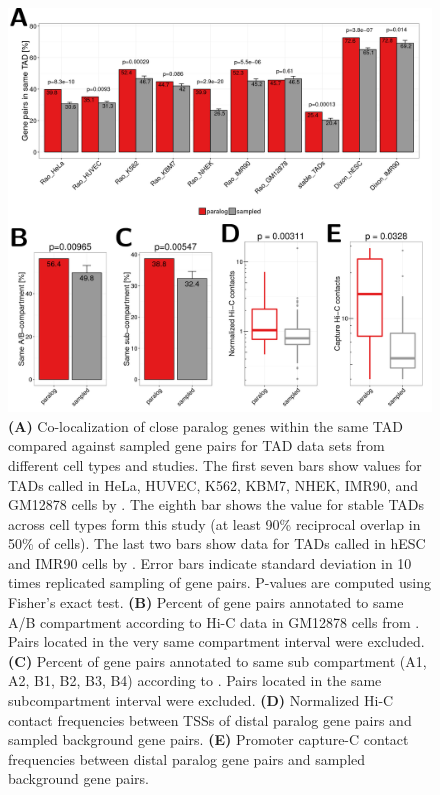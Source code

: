 \documentclass[a4paper,twoside=true,openright,parskip=full,chapterprefix=true,11pt,headings=normal,bibliography=totoc,listof=totoc,titlepage=on,captions=tableabove,draft=false]{scrreprt}
\theoremstyle{definition}
\theoremstyle{definition}
\theoremstyle{definition}
\theoremstyle{remark}
\begin{document}
\begin{figure}

{\centering \includegraphics[width=0.5\linewidth]{figures/paralog/fig3_09} 

}

\caption{\textbf{(A)} Co-localization of close paralog genes within the
same TAD compared against sampled gene pairs for TAD data sets from
different cell types and studies. The first seven bars show values for
TADs called in HeLa, HUVEC, K562, KBM7, NHEK, IMR90, and GM12878 cells
by \citep{Rao2014}. The eighth bar shows the value for stable TADs
across cell types form this study (at least 90\% reciprocal overlap in
50\% of cells). The last two bars show data for TADs called in hESC and
IMR90 cells by \citep{Dixon2012}. Error bars indicate standard deviation
in 10 times replicated sampling of gene pairs. P-values are computed
using Fisher's exact test. \textbf{(B)} Percent of gene pairs annotated
to same A/B compartment according to Hi-C data in GM12878 cells from
\citep{Rao2014}. Pairs located in the very same compartment interval
were excluded. \textbf{(C)} Percent of gene pairs annotated to same sub
compartment (A1, A2, B1, B2, B3, B4) according to \citep{Rao2014}. Pairs
located in the same subcompartment interval were excluded. \textbf{(D)}
Normalized Hi-C contact frequencies between TSSs of distal paralog gene
pairs and sampled background gene pairs. \textbf{(E)} Promoter capture-C
contact frequencies between distal paralog gene pairs and sampled
background gene pairs.}\label{fig:TAD}
\end{figure}
\end{document}
